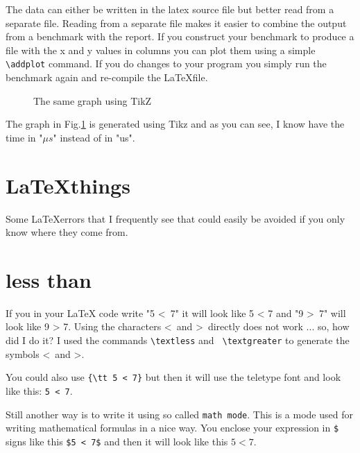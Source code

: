 \documentclass[a4paper,11pt]{article}
\begin{document}
The data can either be written in the latex source file but better read
from a separate file. Reading from a separate file makes it easier to
combine the output from a benchmark with the report. If you construct
your benchmark to produce a file with the x and y values in columns
you can plot them using a simple {\tt \textbackslash addplot}
command. If you do changes to your program you simply run the
benchmark again and re-compile the \LaTeX file.

\begin{figure}
  \centering
  \caption{The same graph using TikZ}
  \label{fig:tikz}
\end{figure}

The graph in Fig.\ref{fig:tikz} is generated using Tikz and as you can
see, I know have the time in "$\mu s$" instead of in "us".


\section*{\LaTeX things}

Some \LaTeX errors that I frequently see that could easily be avoided
if you only know where they come from.

\section*{less than}

If you in your LaTeX code write "5 \textless\ 7" it will look like 5 <
7 and "9 \textgreater\ 7" will look like 9 > 7. Using the characters
\textless\ and \textgreater\ directly does not work ... so, how did I
do it?  I used the commands {\tt  \textbackslash textless} and {\tt
  \textbackslash textgreater} to generate the symbols \textless\ and
\textgreater.

You could also use {\tt \{\textbackslash tt 5 < 7\}} but then it
will use the teletype font and look like this: {\tt 5 < 7}.

Still another way is to write it using so called {\tt math mode}. This
is a mode used for writing mathematical formulas in a nice way. You
enclose your expression in {\tt \$} signs like this {\tt \$5 < 7\$}
and then it will look like this $5 < 7$.
\end{document}
